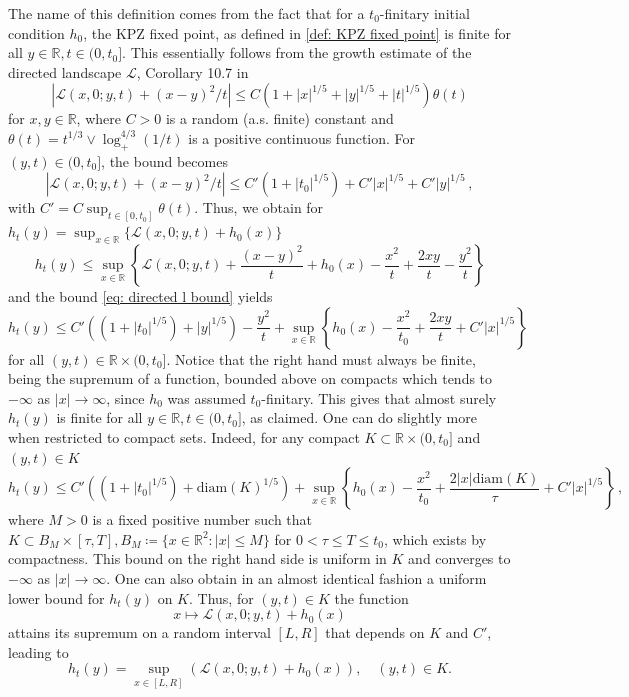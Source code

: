 \documentclass[12pt]{report}
\theoremstyle{plain}
\newcommand{\R}{\ensuremath{\mathbb{R}}}
\begin{document}
The name of this definition comes from the fact that for a $t_0$-finitary initial condition $h_0$, the KPZ fixed point, as defined in \ref{def: KPZ fixed point} is finite for all $y\in\R,t\in(0,t_0]$. This essentially follows from the growth estimate of the directed landscape $\mathcal{L}$, Corollary 10.7 in \cite{DOV}\\
\begin{equation}\label{eq: directed landscape growth estimate}
    |\mathcal{L}(x,0;y,t) + (x-y)^2/t| \leq C(1+|x|^{1/5}+|y|^{1/5}+|t|^{1/5})\theta(t)
\end{equation}
for $x,y\in\R$, where $C>0$ is a random (a.s. finite) constant and $\theta(t) = t^{1/3}\vee \log_+^{4/3} (1/t)$ is a positive continuous function. For $(y,t)\in(0,t_0]$, the bound becomes
\begin{equation}\label{eq: directed l bound}
|\mathcal{L}(x,0;y,t) + (x-y)^2/t| \leq C'(1+|t_0|^{1/5}) + C'|x|^{1/5}+ C'|y|^{1/5}\,,
\end{equation}
with $C' = C\sup_{t\in[0,t_0]}\theta(t)$. Thus, we obtain for $h_t(y) = \sup_{x\in\R}\{\mathcal{L}(x,0;y,t)+h_0(x)\}$
\[
 h_t(y)  \leq \sup_{x\in\R}\left\{\mathcal{L}(x,0;y,t)+\frac{(x-y)^2}{t}+h_0(x)-\frac{x^2}{t}+\frac{2xy}{t}-\frac{y^2}{t}\right\}
\]
and the bound \ref{eq: directed l bound} yields
\[
h_t(y)\leq C'((1+|t_0|^{1/5})+|y|^{1/5})-\frac{y^2}{t}+ \sup_{x\in\R}\left\{h_0(x)-\frac{x^2}{t_0}+\frac{2xy}{t}+C'|x|^{1/5}\right\} 
\]
for all $(y,t)\in\R\times(0,t_0]$. Notice that the right hand must always be finite, being the supremum of a function, bounded above on compacts which tends to $-\infty$ as $|x|\to \infty$, since $h_0$ was assumed $t_0$-finitary. This gives that almost surely $h_t(y)$ is finite for all $y\in\R,t\in(0,t_0]$, as claimed. One can do slightly more when restricted to compact sets. Indeed, for any compact $K\subset\R\times (0,t_0]$ and $(y,t)\in K$
\newpage
\[
h_t(y) \leq C'((1+|t_0|^{1/5})+\text{diam}(K)^{1/5}) + \sup_{x\in\R}\left\{h_0(x)-\frac{x^2}{t_0}+\frac{2|x|\text{diam}(K)}{\tau}+C'|x|^{1/5}\right\}\,, 
\]
where $M>0$ is a fixed positive number such that $K\subset B_M\times[\tau,T], B_M \coloneqq\{x\in\R^2:|x|\leq M\}$ for $0<\tau\leq T\leq t_0$, which exists by compactness. This bound on the right hand side is uniform in $K$ and converges to $-\infty$ as $|x|\to\infty$. One can also obtain in an almost identical fashion a uniform lower bound for $h_t(y)$ on $K$. Thus, for $(y,t)\in K$ the function
\[ 
x\longmapsto \mathcal{L}(x,0;y,t)+h_0(x)
\]
attains its supremum on a random interval $[L,R]$ that depends on $K$ and $C'$, leading to 
\begin{equation}\label{eq: compact containment}
h_t(y) = \sup_{x\in[L,R]}(\mathcal{L}(x,0;y,t)+h_0(x)), \quad (y,t)\in K.
\end{equation}
\end{document}

